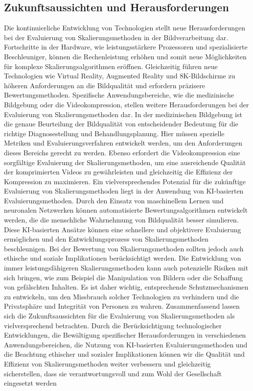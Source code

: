     \subsection{Zukunftsaussichten und Herausforderungen}
    
        Die kontinuierliche Entwicklung von Technologien stellt neue Herausforderungen bei der Evaluierung von Skalierungsmethoden in der Bildverarbeitung dar.
        Fortschritte in der Hardware, wie leistungsstärkere Prozessoren und spezialisierte Beschleuniger, können die Rechenleistung erhöhen und somit neue Möglichkeiten für komplexe Skalierungsalgorithmen eröffnen. Gleichzeitig führen neue Technologien wie Virtual Reality, Augmented Reality und 8K-Bildschirme zu höheren Anforderungen an die Bildqualität und erfordern präzisere Bewertungsmethoden.
        Spezifische Anwendungsbereiche, wie die medizinische Bildgebung oder die Videokompression, stellen weitere Herausforderungen bei der Evaluierung von Skalierungsmethoden dar. 
        In der medizinischen Bildgebung ist die genaue Beurteilung der Bildqualität von entscheidender Bedeutung für die richtige Diagnosestellung und Behandlungsplanung. 
        Hier müssen spezielle Metriken und Evaluierungsverfahren entwickelt werden, um den Anforderungen dieses Bereichs gerecht zu werden. 
        Ebenso erfordert die Videokompression eine sorgfältige Evaluierung der Skalierungsmethoden, um eine ausreichende Qualität der komprimierten Videos zu gewährleisten und gleichzeitig die Effizienz der Kompression zu maximieren.
        Ein vielversprechendes Potenzial für die zukünftige Evaluierung von Skalierungsmethoden liegt in der Anwendung von KI-basierten Evaluierungsmethoden. 
        Durch den Einsatz von maschinellem Lernen und neuronalen Netzwerken können automatisierte Bewertungsalgorithmen entwickelt werden, die die menschliche Wahrnehmung von Bildqualität besser simulieren. 
        Diese KI-basierten Ansätze können eine schnellere und objektivere Evaluierung ermöglichen und den Entwicklungsprozess von Skalierungsmethoden beschleunigen.
        Bei der Bewertung von Skalierungsmethoden sollten jedoch auch ethische und soziale Implikationen berücksichtigt werden. 
        Die Entwicklung von immer leistungsfähigeren Skalierungsmethoden kann auch potenzielle Risiken mit sich bringen, wie zum Beispiel die Manipulation von Bildern oder die Schaffung von gefälschten Inhalten. 
        Es ist daher wichtig, entsprechende Schutzmechanismen zu entwickeln, um den Missbrauch solcher Technologien zu verhindern und die Privatsphäre und Integrität von Personen zu wahren.
        Zusammenfassend lassen sich die Zukunftsaussichten für die Evaluierung von Skalierungsmethoden als vielversprechend betrachten. 
        Durch die Berücksichtigung technologischer Entwicklungen, die Bewältigung spezifischer Herausforderungen in verschiedenen Anwendungsbereichen, die Nutzung von KI-basierten Evaluierungsmethoden und die Beachtung ethischer und sozialer Implikationen können wir die Qualität und Effizienz von Skalierungsmethoden weiter verbessern und gleichzeitig sicherstellen, dass sie verantwortungsvoll und zum Wohl der Gesellschaft eingesetzt werden
\newpage